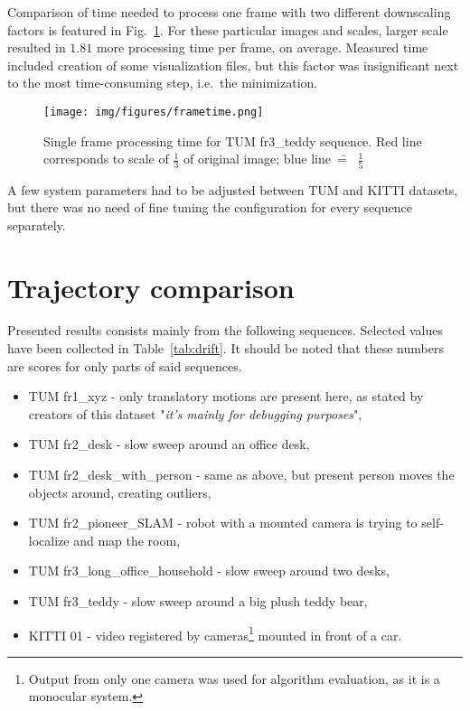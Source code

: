 Comparison of time needed to process one frame with two different downscaling factors is featured in Fig.~\ref{fig:timing}. For these particular images and scales, larger scale resulted in $1.81$ more processing time per frame, on average. Measured time included creation of some visualization files, but this factor was insignificant next to the most time-consuming step, i.e.~the minimization.

\begin{figure}[ht]
	\centering\texttt{[image: img/figures/frametime.png]}
	\caption{ Single frame processing time for TUM fr3\_teddy sequence. Red line corresponds to scale of $\frac{1}{3}$ of original image; blue line~\==~ $\frac{1}{5}$ }
	\label{fig:timing}
\end{figure}


A few system parameters had to be adjusted between TUM and KITTI datasets, but there was no need of fine tuning the configuration for every sequence separately.

\section{Trajectory comparison}

Presented results consists mainly from the following sequences. Selected values have been collected in Table~\ref{tab:drift}. It should be noted that these numbers are scores for only parts of said sequences.
\begin{itemize}
	\item TUM fr1\_xyz - only translatory motions are present here, as stated by creators of this dataset "\textit{it's mainly for debugging purposes}",
	\item TUM fr2\_desk - slow sweep around an office desk,
	\item TUM fr2\_desk\_with\_person - same as above, but present person moves the objects around, creating outliers,
	\item TUM fr2\_pioneer\_SLAM - robot with a mounted camera is trying to self-localize and map the room,
	\item TUM fr3\_long\_office\_household - slow sweep around two desks,
	\item TUM fr3\_teddy - slow sweep around a big plush teddy bear,
	\item KITTI 01 - video registered by cameras\footnote{Output from only one camera was used for algorithm evaluation, as it is a monocular system.} mounted in front of a car.
\end{itemize}


